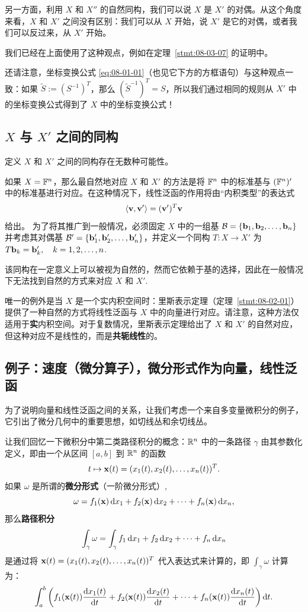 另一方面，利用 $X$ 和 $X''$ 的自然同构，我们可以说 $X$ 是 $X'$ 的对偶。从这个角度来看，$X$ 和 $X'$ 之间没有区别：我们可以从 $X$ 开始，说 $X'$ 是它的对偶，或者我们可以反过来，从 $X'$ 开始。

我们已经在上面使用了这种观点，例如在定理~\ref{stmt:08-03-07} 的证明中。

还请注意，坐标变换公式 \eqref{eq:08-01-01}（也见它下方的方框语句）与这种观点一致：如果 $\widetilde{S} := (S^{-1})^T$，那么 $(\widetilde{S}^{-1})^T = S$，所以我们通过相同的规则从 $X'$ 中的坐标变换公式得到了 $X$ 中的坐标变换公式！

\subsection{\texorpdfstring{$X$ 与 $X'$ 之间的同构}{X 与其对偶空间之间的同构}}\label{sec:08-04-01}

定义 $X$ 和 $X'$ 之间的同构存在无数种可能性。

如果 $X = \mathbb{F}^n$，那么最自然地对应 $X$ 和 $X'$ 的方法是将 $\mathbb{F}^n$ 中的标准基与 $(\mathbb{F}^n)'$ 中的标准基进行对应。在这种情况下，线性泛函的作用将由“内积类型”的表达式 $$\langle \mathbf{v}, \mathbf{v}' \rangle = (\mathbf{v}')^T \mathbf{v}$$ 给出。
为了将其推广到一般情况，必须固定 $X$ 中的一组基 $\mathcal{B} = \{\mathbf{b}_1, \mathbf{b}_2, \dots, \mathbf{b}_n\}$ 并考虑其对偶基 $\mathcal{B}' = \{\mathbf{b}'_1, \mathbf{b}'_2, \dots, \mathbf{b}'_n\}$，并定义一个同构 $T : X \to X'$ 为 $T \mathbf{b}_k = \mathbf{b}'_k,\quad k = 1, 2, \dots, n$.~

该同构在一定意义上可以被视为自然的，然而它依赖于基的选择，因此在一般情况下无法找到自然的方式来对应 $X$ 和 $X'$.

唯一的例外是当 $X$ 是一个实内积空间时：里斯表示定理（定理~\ref{stmt:08-02-01}）提供了一种自然的方式将线性泛函与 $X$ 中的向量进行对应。请注意，这种方法仅适用于\textbf{实}内积空间。对于复数情况，里斯表示定理给出了 $X$ 和 $X'$ 的自然对应，但这种对应不是线性的，而是\textbf{共轭线性}的。

\subsection{例子：速度（微分算子），微分形式作为向量，线性泛函}\label{sec:08-04-02}

为了说明向量和线性泛函之间的关系，让我们考虑一个来自多变量微积分的例子，它引出了微分几何中的重要思想，如切线丛和余切线丛。

让我们回忆一下微积分中第二类路径积分的概念：$\mathbb{R}^n$ 中的一条路径 $\gamma$ 由其参数化定义，即由一个从区间 $[a, b]$ 到 $\mathbb{R}^n$ 的函数
$$t \mapsto \mathbf{x}(t) = (x_1(t), x_2(t), \dots, x_n(t))^T.$$
如果 $\omega$ 是所谓的\textbf{微分形式}（一阶微分形式）,
$$ \omega = f_1(\mathbf{x}) \mathop{}\!\mathrm{d} x_1 + f_2(\mathbf{x}) \mathop{}\!\mathrm{d} x_2 + \dots + f_n(\mathbf{x}) \mathop{}\!\mathrm{d} x_n ,$$
那么\textbf{路径积分} $$\int_\gamma \omega = \int_\gamma f_1 \mathop{}\!\mathrm{d} x_1 + f_2 \mathop{}\!\mathrm{d} x_2 + \dots + f_n \mathop{}\!\mathrm{d} x_n$$
是通过将 $\mathbf{x}(t) = (x_1(t), x_2(t), \dots, x_n(t))^T$ 代入表达式来计算的，即 $\int_\gamma \omega$ 计算为：
$$ \int_a^b \left( f_1(\mathbf{x}(t)) \frac{\mathop{}\!\mathrm{d} x_1(t)}{\mathop{}\!\mathrm{d} t} + f_2(\mathbf{x}(t)) \frac{\mathop{}\!\mathrm{d} x_2(t)}{\mathop{}\!\mathrm{d} t} + \dots + f_n(\mathbf{x}(t)) \frac{\mathop{}\!\mathrm{d} x_n(t)}{\mathop{}\!\mathrm{d} t} \right) \mathop{}\!\mathrm{d} t .$$

